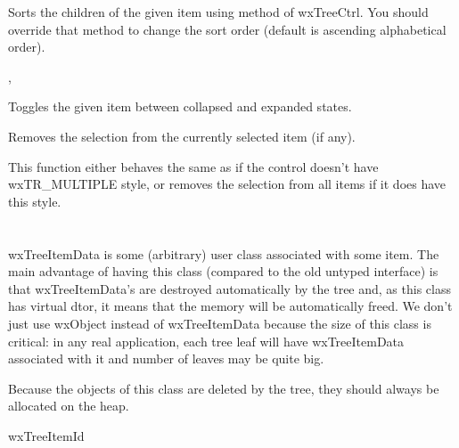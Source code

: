 
Sorts the children of the given item using
 method of wxTreeCtrl. You
should override that method to change the sort order (default is ascending
alphabetical order).


, 

\label{wxtreectrltoggle}


Toggles the given item between collapsed and expanded states.

\label{wxtreectrlunselect}


Removes the selection from the currently selected item (if any).

\label{wxtreectrlunselectall}


This function either behaves the same as 
if the control doesn't have wxTR\_MULTIPLE style, or removes the selection from
all items if it does have this style.

\section{}\label{wxtreeitemdata}

wxTreeItemData is some (arbitrary) user class associated with some item. The
main advantage of having this class (compared to the old untyped interface) is
that wxTreeItemData's are destroyed automatically by the tree and, as this
class has virtual dtor, it means that the memory will be automatically
freed. We don't just use wxObject instead of wxTreeItemData because
the size of this class is critical: in any real application, each tree leaf
will have wxTreeItemData associated with it and number of leaves may be
quite big.

Because the objects of this class are deleted by the tree, they should
always be allocated on the heap.


wxTreeItemId

